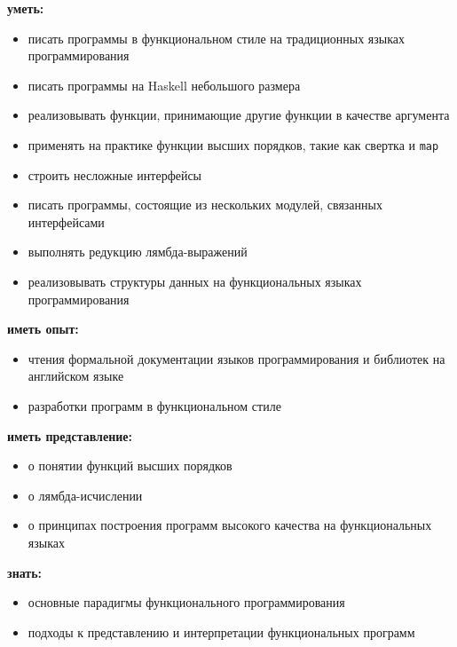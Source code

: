 

\noindent\textbf{уметь:}
	\begin{itemize}[topsep=1mm]
		\item писать программы в функциональном стиле на традиционных языках программирования
		\item писать программы на Haskell небольшого размера
		\item реализовывать функции, принимающие другие функции в качестве аргумента
		\item применять на практике функции высших порядков, такие как свертка и \texttt{map}
		\item строить несложные интерфейсы
		\item писать программы, состоящие из нескольких модулей, связанных интерфейсами
		\item выполнять редукцию лямбда-выражений
		\item реализовывать структуры данных на функциональных языках программирования
	\end{itemize}
 
\noindent\textbf{иметь опыт:}
	\begin{itemize}[topsep=1mm]
		\item чтения формальной документации языков программирования и библиотек на английском языке
		\item разработки программ в функциональном стиле
	\end{itemize}

\noindent\textbf{иметь представление:}
	\begin{itemize}[topsep=1mm]
		\item о понятии функций высших порядков
		\item о лямбда-исчислении
		\item о принципах построения программ высокого качества на функциональных языках
	\end{itemize}

\noindent\textbf{знать:}
	\begin{itemize}[topsep=1mm]
		\item основные парадигмы функционального программирования
		\item подходы к представлению и интерпретации функциональных программ
	\end{itemize}


